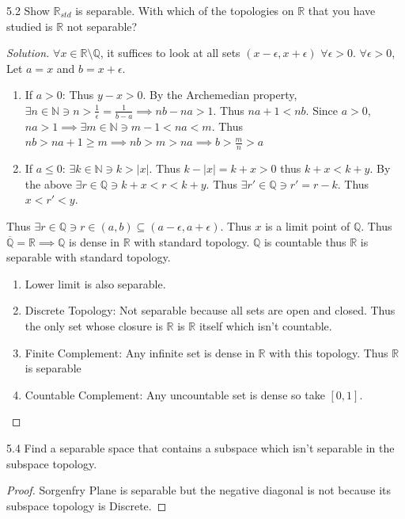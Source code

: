 \documentclass{article}
\newcommand{\R}{\mathbb{R}}
\newcommand{\Q}{\mathbb{Q}}
\newcommand{\N}{\mathbb{N}}
\newcommand{\abs}[1]{\left\lvert #1\right\rvert}
\newenvironment{solution}
{\renewcommand\qedsymbol{$\blacksquare$}\begin{proof}[Solution]}
{\end{proof}}
\begin{document}
\begin{PROB}{5.2}\label{Problem 5.2.}
    Show $\R_{s td}$ is separable. With which of the topologies on $\R$ that you have studied is $\R$ not separable?   
\end{PROB}
\begin{solution}
    $\forall x \in \R \setminus \Q$, it suffices to look at all sets $(x - \epsilon, x + \epsilon)$ $\forall \epsilon > 0$. $\forall \epsilon > 0$, Let $a = x$ and $b = x + \epsilon$.
    
    \begin{enumerate}
        \item If $a > 0$: Thus $y - x > 0$. By the Archemedian property, $\exists n \in \N \ni n > \frac{1}{\epsilon} = \frac{1}{b - a} \implies nb - na > 1$. Thus $na + 1 < nb$. Since $a > 0$, $na > 1 \implies \exists m \in \N \ni m - 1 < na < m$. Thus $nb > na + 1 \geq m \implies nb > m > na \implies b > \frac{m}{n} > a$
        \item If $a \leq 0$: $\exists k \in \N \ni k > \abs{x}$. Thus $k - \abs{x} = k + x > 0$ thus $k + x < k + y$. By the above $\exists r \in \Q \ni k + x < r < k + y$. Thus $\exists r' \in \Q \ni r' = r - k$. Thus $x < r' < y$.       
    \end{enumerate}

    Thus $\exists r \in \Q \ni r \in (a, b) \subseteq (a - \epsilon, a+ \epsilon)$. Thus $x$ is a limit point of $\Q$. Thus $\overline{\Q} = \R \implies \Q$ is dense in $\R$ with standard topology. $\Q$ is countable thus $\R$ is separable with standard topology. 
    
    \begin{enumerate}
        \item Lower limit is also separable. 

        \item Discrete Topology: Not separable because all sets are open and closed. Thus the only set whose closure is $\R$ is $\R$ itself which isn't countable. 
        \item Finite Complement: Any infinite set is dense in $\R$ with this topology. Thus $\R$ is separable
        \item Countable Complement: Any uncountable set is dense so take $[0, 1]$.   
    \end{enumerate}
\end{solution}

\bigskip

\begin{PROB}{5.4}\label{Problem 5.4.}
    Find a separable space that contains a subspace which isn't separable in the subspace topology.
\end{PROB}
\begin{proof}
    Sorgenfry Plane is separable but the negative diagonal is not because its subspace topology is Discrete. 
\end{proof}
\end{document}
